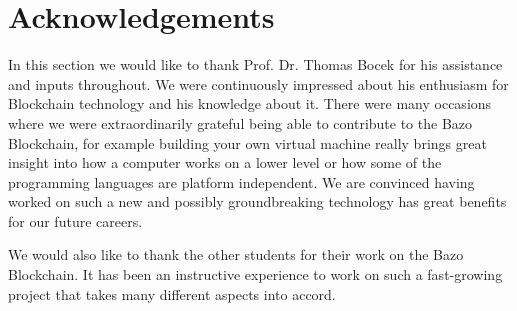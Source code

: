 \chapter*{Acknowledgements}
\thispagestyle{main} %
	In this section we would like to thank Prof. Dr. Thomas Bocek for his assistance and inputs throughout. We were continuously impressed about his enthusiasm for Blockchain technology and his knowledge about it. There were many occasions where we were extraordinarily grateful being able to contribute to the Bazo Blockchain, for example building your own virtual machine really brings great insight into how a computer works on a lower level or how some of the programming languages are platform independent. We are convinced having worked on such a new and possibly groundbreaking technology has great benefits for our future careers.
	
	We would also like to thank the other students for their work on the Bazo Blockchain. It has been an instructive experience to work on such a fast-growing project that takes many different aspects into accord.